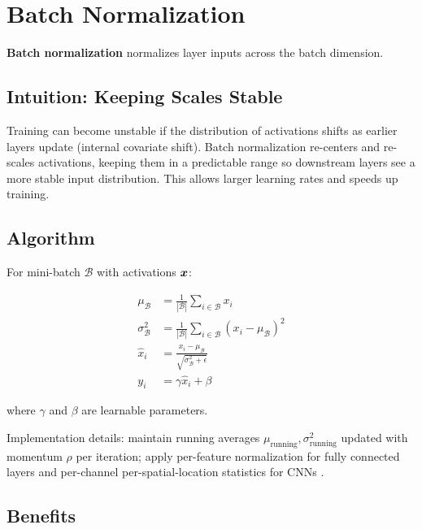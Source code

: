 
\section{Batch Normalization }
\label{sec:batch-normalization}

\textbf{Batch normalization} normalizes layer inputs across the batch dimension.

\subsection{Intuition: Keeping Scales Stable}

Training can become unstable if the distribution of activations shifts as earlier layers update (internal covariate shift). Batch normalization re-centers and re-scales activations, keeping them in a predictable range so downstream layers see a more stable input distribution. This allows larger learning rates and speeds up training.

\subsection{Algorithm}

For mini-batch $\mathcal{B}$ with activations $\boldsymbol{x}$:

\begin{align}
\mu_{\mathcal{B}} &= \frac{1}{|\mathcal{B}|} \sum_{i \in \mathcal{B}} x_i \\
\sigma^2_{\mathcal{B}} &= \frac{1}{|\mathcal{B}|} \sum_{i \in \mathcal{B}} (x_i - \mu_{\mathcal{B}})^2 \\
\hat{x}_i &= \frac{x_i - \mu_{\mathcal{B}}}{\sqrt{\sigma^2_{\mathcal{B}} + \epsilon}} \\
y_i &= \gamma \hat{x}_i + \beta
\end{align}

where $\gamma$ and $\beta$ are learnable parameters.

Implementation details: maintain running averages $\mu_{\text{running}}, \sigma^2_{\text{running}}$ updated with momentum $\rho$ per iteration; apply per-feature normalization for fully connected layers and per-channel per-spatial-location statistics for CNNs \cite{Ioffe2015,GoodfellowEtAl2016}.

\subsection{Benefits}

